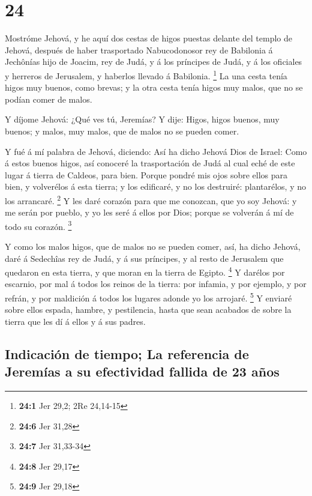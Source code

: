 \hypertarget{section-23}{%
\section{24}\label{section-23}}

 Mostróme Jehová, y he aquí dos cestas de higos puestas
delante del templo de Jehová, después de haber trasportado Nabucodonosor
rey de Babilonia á Jechônías hijo de Joacim, rey de Judá, y á los
príncipes de Judá, y á los oficiales y herreros de Jerusalem, y haberlos
llevado á Babilonia. \footnote{\textbf{24:1} Jer 29,2; 2Re 24,14-15}
 La una cesta tenía higos muy buenos, como brevas; y la otra
cesta tenía higos muy malos, que no se podían comer de malos.

 Y díjome Jehová: ¿Qué ves tú, Jeremías? Y dije: Higos,
higos buenos, muy buenos; y malos, muy malos, que de malos no se pueden
comer.

 Y fué á mí palabra de Jehová, diciendo:  Así ha
dicho Jehová Dios de Israel: Como á estos buenos higos, así conoceré la
trasportación de Judá al cual eché de este lugar á tierra de Caldeos,
para bien.  Porque pondré mis ojos sobre ellos para bien, y
volverélos á esta tierra; y los edificaré, y no los destruiré:
plantarélos, y no los arrancaré. \footnote{\textbf{24:6} Jer 31,28}
 Y les daré corazón para que me conozcan, que yo soy Jehová:
y me serán por pueblo, y yo les seré á ellos por Dios; porque se
volverán á mí de todo su corazón. \footnote{\textbf{24:7} Jer 31,33-34}

 Y como los malos higos, que de malos no se pueden comer,
así, ha dicho Jehová, daré á Sedechîas rey de Judá, y á sus príncipes, y
al resto de Jerusalem que quedaron en esta tierra, y que moran en la
tierra de Egipto. \footnote{\textbf{24:8} Jer 29,17}  Y
darélos por escarnio, por mal á todos los reinos de la tierra: por
infamia, y por ejemplo, y por refrán, y por maldición á todos los
lugares adonde yo los arrojaré. \footnote{\textbf{24:9} Jer 29,18}
 Y enviaré sobre ellos espada, hambre, y pestilencia, hasta
que sean acabados de sobre la tierra que les dí á ellos y á sus padres.

\hypertarget{indicaciuxf3n-de-tiempo-la-referencia-de-jeremuxedas-a-su-efectividad-fallida-de-23-auxf1os}{%
\subsection{Indicación de tiempo; La referencia de Jeremías a su
efectividad fallida de 23
años}\label{indicaciuxf3n-de-tiempo-la-referencia-de-jeremuxedas-a-su-efectividad-fallida-de-23-auxf1os}}

